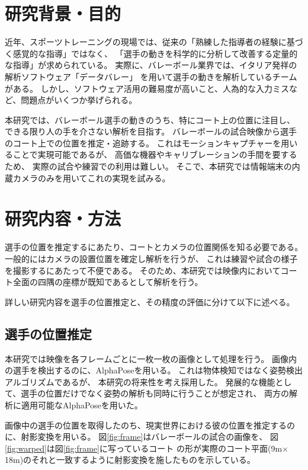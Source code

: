 \documentclass[twoside,twocolumn]{jsarticle}
\begin{document}
\maketitle
\section{研究背景・目的}
    近年、スポーツトレーニングの現場では、従来の「熟練した指導者の経験に基づく感覚的な指導」ではなく、
    「選手の動きを科学的に分析して改善する定量的な指導」が求められている。
    実際に、バレーボール業界では、イタリア発祥の解析ソフトウェア「データバレー」
    を用いて選手の動きを解析しているチームがある。
    しかし、ソフトウェア活用の難易度が高いこと、人為的な入力ミスなど、問題点がいくつか挙げられる。

    本研究では、バレーボール選手の動きのうち、特にコート上の位置に注目し、
    できる限り人の手を介さない解析を目指す。
    バレーボールの試合映像から選手のコート上での位置を推定・追跡する。
    これはモーションキャプチャーを用いることで実現可能であるが、
    高価な機器やキャリブレーションの手間を要するため、
    実際の試合や練習での利用は難しい。
    そこで、本研究では情報端末の内蔵カメラのみを用いてこれの実現を試みる。
\section{研究内容・方法}
    選手の位置を推定するにあたり、コートとカメラの位置関係を知る必要である。
    一般的にはカメラの設置位置を確定し解析を行うが、
    これは練習や試合の様子を撮影するにあたって不便である。
    そのため、本研究では映像内においてコート全面の四隅の座標が既知であるとして解析を行う。

    詳しい研究内容を選手の位置推定と、その精度の評価に分けて以下に述べる。

	\subsection{選手の位置推定} \label{sec:pos}
        本研究では映像を各フレームごとに一枚一枚の画像として処理を行う。
        画像内の選手を検出するのに、AlphaPose\cite{Fang}を用いる。
        これは物体検知ではなく姿勢検出アルゴリズムであるが、
        本研究の将来性を考え採用した。
        発展的な機能として、選手の位置だけでなく姿勢の解析も同時に行うことが想定され、
        両方の解析に適用可能なAlphaPoseを用いた。
        
        画像中の選手の位置を取得したのち、現実世界における彼の位置を推定するのに、射影変換を用いる。
        図\ref{fig:frame}はバレーボールの試合の画像を、
        図\ref{fig:warped}は図\ref{fig:frame}に写っているコート
        の形が実際のコート平面(9m$\times$18m)のそれと一致するように射影変換を施したものを示している。
\end{document}
